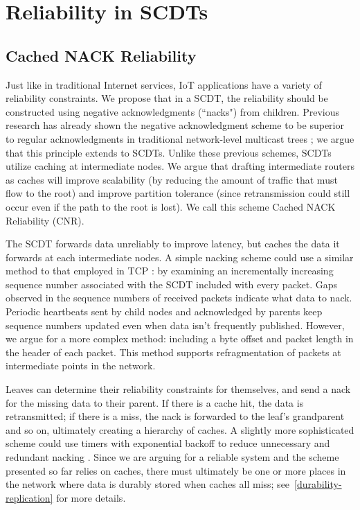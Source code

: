 \chapter{Reliability in SCDTs}

\section{Cached NACK Reliability}
Just like in traditional Internet services, IoT applications have a variety of
reliability constraints.  We propose that in a SCDT, the reliability should be
constructed using negative acknowledgments (``nacks") from children.  Previous
research has already shown the negative acknowledgment scheme to be superior to
regular acknowledgments in traditional network-level multicast trees
\cite{SRM, RFC3208}; we argue that this principle extends to SCDTs.
Unlike these previous schemes, SCDTs utilize caching at intermediate nodes.  We
argue that drafting intermediate routers as caches will improve scalability (by
reducing the amount of traffic that must flow to the root) and improve partition
tolerance (since retransmission could still occur even if the path to the root
is lost).  We call this scheme Cached NACK Reliability (CNR).

The SCDT forwards data unreliably to improve latency, but caches the data it
forwards at each intermediate nodes.  A simple nacking scheme could use a similar method to that employed in TCP \cite{RFC0793}: by examining an incrementally increasing sequence number associated with the SCDT included with every packet.  Gaps observed in the sequence numbers of received packets indicate what data to nack.  Periodic heartbeats sent by child nodes and acknowledged by parents keep sequence numbers updated even when data isn't frequently published.  However, we argue for a more complex method: including a byte offset and packet length in the header of each packet.  This method supports refragmentation of packets at intermediate points in the network.

Leaves can determine their reliability constraints for themselves, and send a
nack for the missing data to their parent.  If there is a cache hit, the data is
retransmitted; if there is a miss, the nack is forwarded to the leaf's
grandparent and so on, ultimately creating a hierarchy of caches.  A slightly
more sophisticated scheme could use timers with exponential backoff to reduce
unnecessary and redundant nacking \cite{SRM, RFC3208}.  Since we are
arguing for a reliable system and the scheme presented so far relies on caches,
there must ultimately be one or more places in the network where data is durably
stored when caches all miss; 
see~\autoref{durability-replication} for more
details.

